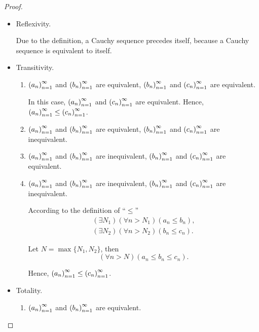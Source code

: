 \begin{proof}
    \begin{itemize}
        \item Reflexivity.

              Due to the definition, a Cauchy sequence precedes itself, because a Cauchy sequence is equivalent to itself.
        \item Transitivity.

              \begin{enumerate}[label={\textbf{Case \arabic*.}},itemindent=0.5cm]
                  \item ${\left({a_{n}}\right)}^{\infty}_{n=1}$ and ${\left({b_{n}}\right)}^{\infty}_{n=1}$ are equivalent, ${\left({b_{n}}\right)}^{\infty}_{n=1}$ and ${\left({c_{n}}\right)}^{\infty}_{n=1}$ are equivalent.

                        In this case, ${\left({a_{n}}\right)}^{\infty}_{n=1}$ and ${\left({c_{n}}\right)}^{\infty}_{n=1}$ are equivalent. Hence, ${\left({a_{n}}\right)}^{\infty}_{n=1}\le{\left({c_{n}}\right)}^{\infty}_{n=1}$.
                  \item ${\left({a_{n}}\right)}^{\infty}_{n=1}$ and ${\left({b_{n}}\right)}^{\infty}_{n=1}$ are equivalent, ${\left({b_{n}}\right)}^{\infty}_{n=1}$ and ${\left({c_{n}}\right)}^{\infty}_{n=1}$ are inequivalent.
                  \item ${\left({a_{n}}\right)}^{\infty}_{n=1}$ and ${\left({b_{n}}\right)}^{\infty}_{n=1}$ are inequivalent, ${\left({b_{n}}\right)}^{\infty}_{n=1}$ and ${\left({c_{n}}\right)}^{\infty}_{n=1}$ are equivalent.
                  \item ${\left({a_{n}}\right)}^{\infty}_{n=1}$ and ${\left({b_{n}}\right)}^{\infty}_{n=1}$ are inequivalent, ${\left({b_{n}}\right)}^{\infty}_{n=1}$ and ${\left({c_{n}}\right)}^{\infty}_{n=1}$ are inequivalent.

                        According to the definition of ``$\le$''
                        \[
                            \begin{split}
                                (\exists N_{1})(\forall n > N_{1})(a_{n}\le b_{n}), \\
                                (\exists N_{2})(\forall n > N_{2})(b_{n}\le c_{n}).
                            \end{split}
                        \]

                        Let $N = \max\{ N_{1}, N_{2} \}$, then
                        \[
                            (\forall n > N)(a_{n}\le b_{n}\le c_{n}).
                        \]

                        Hence, ${\left({a_{n}}\right)}^{\infty}_{n=1}\le{\left({c_{n}}\right)}^{\infty}_{n=1}$.
              \end{enumerate}
        \item Totality.
              \begin{enumerate}[label={\textbf{Case \arabic*.}},itemsep=0pt]
                  \item ${\left({a_{n}}\right)}^{\infty}_{n=1}$ and ${\left({b_{n}}\right)}^{\infty}_{n=1}$ are equivalent.


\end{enumerate}
\end{itemize}
\end{proof}
